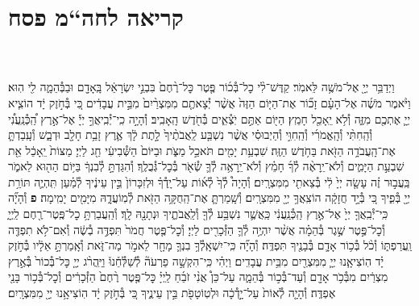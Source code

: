 \documentclass[twoside, openany, parskip=half, 11pt]{book}
\begin{document}
\begin{footnotesize}
\begin{multicols}{2}
\end{multicols}

\section[חה“מ פסח]{קריאה לחה“מ פסח}


\begin{multicols}{2}

\\ \\
וַיְדַבֵּ֥ר יְיָ֖ אֶל־מֹשֶׁ֥ה לֵּאמֹֽר׃ קַדֶּשׁ־לִ֨י כׇל־בְּ֯כ֜וֹר פֶּ֤טֶר כׇּל־רֶ֨חֶם֙ בִּבְנֵ֣י יִשְׂרָאֵ֔ל בָּֽאָדָ֖ם וּבַבְּ֯הֵמָ֑ה לִ֖י הֽוּא׃ וַיֹּ֨אמֶר מֹשֶׁ֜ה אֶל־הָעָ֗ם זָכ֞וֹר אֶת־הַיּ֤וֹם הַזֶּה֙ אֲשֶׁ֨ר יְ֯צָאתֶ֤ם מִמִּצְרַ֨יִם֙ מִבֵּ֣ית עֲבָדִ֔ים כִּ֚י בְּ֯חֹ֣זֶק יָ֔ד הוֹצִ֧יא יְיָ֛ אֶתְכֶ֖ם מִזֶּ֑ה וְ֯לֹ֥א יֵֽאָכֵ֖ל חָמֵֽץ׃ הַיּ֖וֹם אַתֶּ֣ם יֹֽצְ֯אִ֑ים בְּ֯חֹ֖דֶשׁ הָֽאָבִֽיב׃
וְ֯הָיָ֣ה כִֽי־יְ֯בִֽיאֲךָ֣ יְיָ֡ אֶל־אֶ֣רֶץ הַֽ֠כְּ֯נַֽעֲנִ֠י וְ֯הַֽחִתִּ֨י וְ֯הָֽאֱמֹרִ֜י וְ֯הַֽחִוִּ֣י וְ֯הַיְבוּסִ֗י אֲשֶׁ֨ר נִשְׁבַּ֤ע לַֽאֲבֹתֶ֨יךָ֙ לָ֣תֶת לָ֔ךְ אֶ֛רֶץ זָבַ֥ת חָלָ֖ב וּדְבָ֑שׁ וְ֯עָֽבַדְתָּ֛ אֶת־הָֽעֲבֹדָ֥ה הַזֹּ֖את בַּחֹ֥דֶשׁ הַזֶּֽה׃ שִׁבְעַ֥ת יָמִ֖ים תֹּאכַ֣ל מַצֹּ֑ת וּבַיּוֹם֙ הַשְּׁ֯בִיעִ֔י חַ֖ג לַיְיָ׃ מַצּוֹת֙ יֵֽאָכֵ֔ל אֵ֖ת שִׁבְעַ֣ת הַיָּמִ֑ים וְ֯לֹא־יֵֽרָאֶ֨ה לְ֯ךָ֜ חָמֵ֗ץ וְ֯לֹא־יֵֽרָאֶ֥ה לְ֯ךָ֛ שְׂ֯אֹ֖ר בְּ֯כׇל־גְּ֯בֻלֶֽךָ׃ וְ֯הִגַּדְתָּ֣ לְ֯בִנְךָ֔ בַּיּ֥וֹם הַה֖וּא לֵאמֹ֑ר בַּֽעֲב֣וּר זֶ֗ה עָשָׂ֤ה יְיָ֙ לִ֔י בְּ֯צֵאתִ֖י מִמִּצְרָֽיִם׃ וְ֯הָיָה֩ לְ֯ךָ֙ לְ֯א֜וֹת עַל־יָֽדְ֯ךָ֗ וּלְזִכָּרוֹן֙ בֵּ֣ין עֵינֶ֔יךָ לְ֯מַ֗עַן תִּֽהְיֶ֛ה תּוֹרַ֥ת יְיָ֖ בְּ֯פִ֑יךָ כִּ֚י בְּ֯יָ֣ד חֲזָקָ֔ה הוֹצִֽאֲךָ֥ יְיָ֖ מִמִּצְרָֽיִם׃ וְ֯שָֽׁמַרְתָּ֛ אֶת־הַֽחֻקָּ֥ה הַזֹּ֖את לְ֯מֽוֹעֲדָ֑הּ מִיָּמִ֖ים יָמִֽימָה׃ \textbf{פ}
וְ֯הָיָ֞ה כִּֽי־יְ֯בִֽאֲךָ֤ יְיָ֙ אֶל־אֶ֣רֶץ הַֽכְּ֯נַֽעֲנִ֔י כַּֽאֲשֶׁ֛ר נִשְׁבַּ֥ע לְ֯ךָ֖ וְ֯לַֽאֲבֹתֶ֑יךָ וּנְתָנָ֖הּ לָֽךְ׃ וְ֯הַֽעֲבַרְתָּ֥ כׇל־פֶּֽטֶר־רֶ֖חֶם לַֽיְיָ֑ וְ֯כׇל־פֶּ֣טֶר שֶׁ֣גֶר בְּ֯הֵמָ֗ה אֲשֶׁ֨ר יִהְיֶ֥ה לְ֯ךָ֛ הַזְּ֯כָרִ֖ים לַיְיָ׃ וְ֯כׇל־פֶּ֤טֶר חֲמֹר֙ תִּפְדֶּ֣ה בְ֯שֶׂ֔ה וְ֯אִם־לֹ֥א תִפְדֶּ֖ה וַֽעֲרַפְתּ֑וֹ וְ֯כֹ֨ל בְּ֯כ֥וֹר אָדָ֛ם בְּ֯בָנֶ֖יךָ תִּפְדֶּֽה׃ וְ֯הָיָ֞ה כִּֽי־יִשְׁאָֽלְ֯ךָ֥ בִנְךָ֛ מָחָ֖ר לֵאמֹ֣ר מַה־זֹּ֑את וְ֯אָֽמַרְתָּ֣ אֵלָ֔יו בְּ֯חֹ֣זֶק יָ֗ד הֽוֹצִיאָ֧נוּ יְיָ֛ מִמִּצְרַ֖יִם מִבֵּ֥ית עֲבָדִֽים׃ וַיְהִ֗י כִּֽי־הִקְשָׁ֣ה פַרְעֹה֘ לְ֯שַׁלְּ֯חֵ֒נוּ֒ וַיַּֽהֲרֹ֨ג יְיָ֤ כׇּל־בְּ֯כוֹר֙ בְּ֯אֶ֣רֶץ מִצְרַ֔יִם מִבְּ֯כֹ֥ר אָדָ֖ם וְ֯עַד־בְּ֯כ֣וֹר בְּ֯הֵמָ֑ה עַל־כֵּן֩ אֲנִ֨י זֹבֵ֜חַ לַֽיְיָ֗ כׇּל־פֶּ֤טֶר רֶ֨חֶם֙ הַזְּ֯כָרִ֔ים וְ֯כׇל־בְּ֯כ֥וֹר בָּנַ֖י אֶפְדֶּֽה׃ וְ֯הָיָ֤ה לְ֯אוֹת֙ עַל־יָ֣דְ֯כָ֔ה וּלְטֽוֹטָפֹ֖ת בֵּ֣ין עֵינֶ֑יךָ כִּ֚י בְּ֯חֹ֣זֶק יָ֔ד הֽוֹצִיאָ֥נוּ יְיָ֖ מִמִּצְרָֽיִם׃



\end{multicols}
\end{footnotesize}
\end{document}
